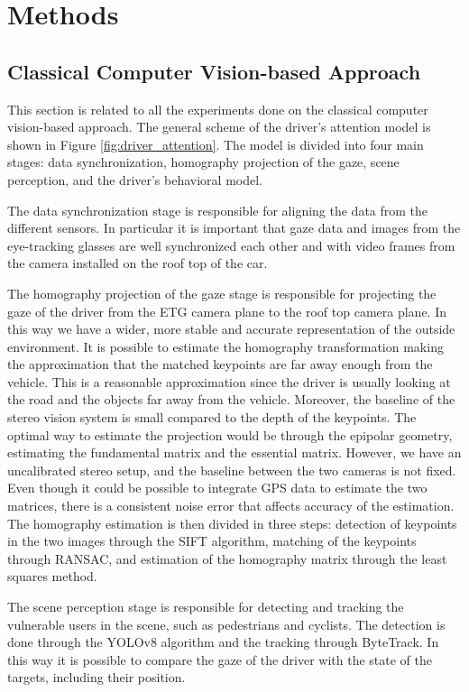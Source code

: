 \chapter{Methods}

\section{Classical Computer Vision-based Approach}

This section is related to all the experiments done on the classical computer 
vision-based approach. The general scheme of the driver's attention model is 
shown in Figure \ref{fig:driver_attention}. 
The model is divided into four main stages: data synchronization, homography 
projection of the gaze, scene perception, and the driver's behavioral model. 

The data synchronization stage is responsible for aligning the data from the 
different sensors. In particular it is important that gaze data and 
images from the 
eye-tracking glasses are well synchronized each other and with video frames 
from the camera installed on the roof top of the car.

The homography projection of the gaze stage is responsible for projecting the 
gaze of the driver from the ETG camera plane to the roof top camera plane.
In this way we have a wider, more stable and accurate representation of 
the outside environment.
It is possible to 
estimate the homography transformation making the approximation that the matched 
keypoints are far away enough from the vehicle. This is a reasonable 
approximation since the driver is usually looking at the road and the objects 
far away from the vehicle. Moreover, the baseline of the stereo vision system is 
small compared to the depth of the keypoints.
The optimal way to estimate the projection would be through the epipolar 
geometry, estimating the fundamental matrix and the essential matrix. 
However, we have an uncalibrated stereo setup, and the baseline between the two 
cameras is not fixed. Even though it could be possible to integrate GPS data 
to estimate the two matrices, there is a consistent noise error that affects 
accuracy of the estimation.
The homography estimation is then divided in three steps: detection of keypoints 
in the two images through the SIFT algorithm, matching of the keypoints through 
RANSAC, and estimation of the homography matrix through the least squares method.

The scene perception stage is responsible for detecting and tracking the vulnerable 
users in the scene, such as pedestrians and cyclists. The detection is done 
through the YOLOv8 algorithm and the tracking through ByteTrack. In this way 
it is possible to compare the gaze of the driver with the state of the targets, 
including their position.

